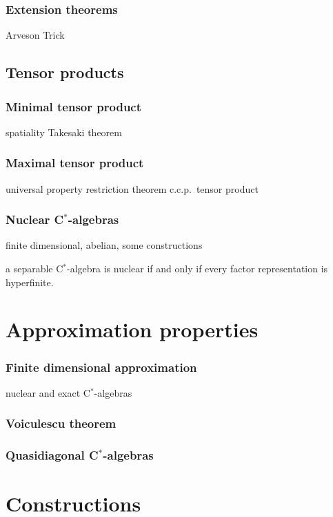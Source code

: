 \documentclass{../../large}
\begin{document}
\section{Extension theorems}

Arveson
Trick




\chapter{Tensor products}

\section{Minimal tensor product}
spatiality
Takesaki theorem

\section{Maximal tensor product}

universal property
restriction theorem
c.c.p.~tensor product

\section{Nuclear C$^*$-algebras}
finite dimensional, abelian, some constructions




a separable C$^*$-algebra is nuclear if and only if every factor representation is hyperfinite.





\part{Approximation properties}

\section{Finite dimensional approximation}
nuclear and exact C$^*$-algebras
\section{Voiculescu theorem}
\section{Quasidiagonal C$^*$-algebras}


\part{Constructions}
\end{document}
